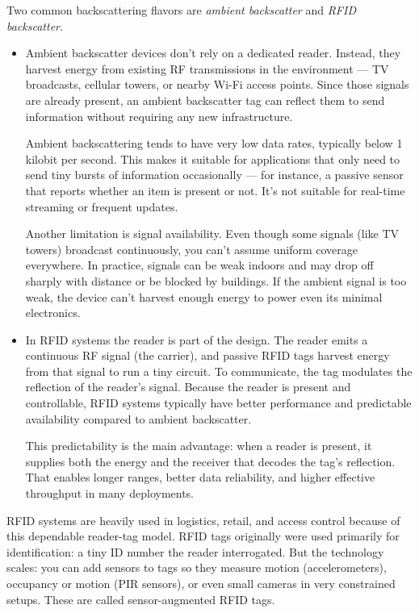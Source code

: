 Two common backscattering flavors are \textit{ambient backscatter} and \textit{RFID backscatter}.
\begin{itemize}
    \item Ambient backscatter devices don’t rely on a dedicated reader. Instead, they harvest energy from existing RF transmissions in the environment — TV broadcasts, cellular towers, or nearby Wi-Fi access points. Since those signals are already present, an ambient backscatter tag can reflect them to send information without requiring any new infrastructure.

    Ambient backscattering tends to have very low data rates, typically below 1 kilobit per second. This makes it suitable for applications that only need to send tiny bursts of information occasionally — for instance, a passive sensor that reports whether an item is present or not. It’s not suitable for real-time streaming or frequent updates.

    Another limitation is signal availability. Even though some signals (like TV towers) broadcast continuously, you can’t assume uniform coverage everywhere. In practice, signals can be weak indoors and may drop off sharply with distance or be blocked by buildings. If the ambient signal is too weak, the device can’t harvest enough energy to power even its minimal electronics.
    
    \item In RFID systems the reader is part of the design. The reader emits a continuous RF signal (the carrier), and passive RFID tags harvest energy from that signal to run a tiny circuit. To communicate, the tag modulates the reflection of the reader’s signal. Because the reader is present and controllable, RFID systems typically have better performance and predictable availability compared to ambient backscatter.

    This predictability is the main advantage: when a reader is present, it supplies both the energy and the receiver that decodes the tag’s reflection. That enables longer ranges, better data reliability, and higher effective throughput in many deployments.
\end{itemize}
RFID systems are heavily used in logistics, retail, and access control because of this dependable reader-tag model.
RFID tags originally were used primarily for identification: a tiny ID number the reader interrogated. But the technology scales: you can add sensors to tags so they measure motion (accelerometers), occupancy or motion (PIR sensors), or even small cameras in very constrained setups. These are called sensor-augmented RFID tags.

